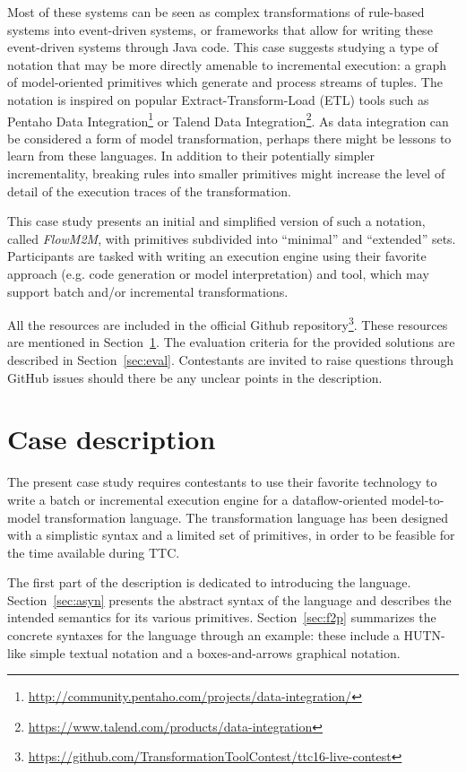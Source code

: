 \documentclass[a4paper]{scrartcl}
\newcommand{\FlowMM}{\emph{FlowM2M}\xspace}
\begin{document}
Most of these systems can be seen as complex transformations of
rule-based systems into event-driven systems, or frameworks that allow
for writing these event-driven systems through Java code. This case
suggests studying a type of notation that may be more directly
amenable to incremental execution: a graph of model-oriented
primitives which generate and process streams of tuples. The notation
is inspired on popular Extract-Transform-Load (ETL) tools such as
Pentaho Data
Integration\footnote{\url{http://community.pentaho.com/projects/data-integration/}}
or Talend Data
Integration\footnote{\url{https://www.talend.com/products/data-integration}}. As
data integration can be considered a form of model transformation,
perhaps there might be lessons to learn from these languages. In
addition to their potentially simpler incrementality, breaking rules
into smaller primitives might increase the level of detail of the
execution traces of the transformation.

This case study presents an initial and simplified version of such a
notation, called \FlowMM, with primitives subdivided into ``minimal''
and ``extended'' sets. Participants are tasked with writing an
execution engine using their favorite approach (e.g. code generation
or model interpretation) and tool, which may support batch and/or
incremental transformations.

All the resources are included in the official Github
repository\footnote{\url{https://github.com/TransformationToolContest/ttc16-live-contest}}. These
resources are mentioned in Section~\ref{sec:case}. The evaluation
criteria for the provided solutions are described in
Section~\ref{sec:eval}. Contestants are invited to raise questions
through GitHub issues should there be any unclear points in the
description.

\section{Case description}
\label{sec:case}

The present case study requires contestants to use their favorite
technology to write a batch or incremental execution engine for a
dataflow-oriented model-to-model transformation language. The
transformation language has been designed with a simplistic syntax and
a limited set of primitives, in order to be feasible for the time
available during TTC.

The first part of the description is dedicated to introducing the
language. Section~\ref{sec:asyn} presents the abstract syntax of the
language and describes the intended semantics for its various
primitives. Section~\ref{sec:f2p} summarizes the concrete syntaxes for
the language through an example: these include a HUTN-like simple
textual notation and a boxes-and-arrows graphical notation.
\end{document}
